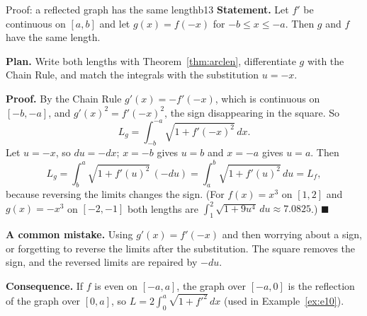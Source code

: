 \documentclass[11pt]{article}
\begin{document}
\begin{exmp}{Proof: a reflected graph has the same length}{b13}
\textbf{Statement.} Let $f'$ be continuous on $[a,b]$ and let $g(x)=f(-x)$ for $-b\le x\le-a$. Then $g$ and $f$ have the same length.

\textbf{Plan.} Write both lengths with Theorem~\ref{thm:arclen}, differentiate $g$ with the Chain Rule, and match the integrals with the substitution $u=-x$.

\textbf{Proof.} By the Chain Rule $g'(x)=-f'(-x)$, which is continuous on $[-b,-a]$, and $g'(x)^2=f'(-x)^2$, the sign disappearing in the square. So
\[
L_g=\int_{-b}^{-a}\sqrt{1+f'(-x)^2}\,dx .
\]
Let $u=-x$, so $du=-dx$; $x=-b$ gives $u=b$ and $x=-a$ gives $u=a$. Then
\[
L_g=\int_b^a\sqrt{1+f'(u)^2}\,(-du)=\int_a^b\sqrt{1+f'(u)^2}\,du=L_f ,
\]
because reversing the limits changes the sign. (For $f(x)=x^3$ on $[1,2]$ and $g(x)=-x^3$ on $[-2,-1]$ both lengths are $\int_1^2\sqrt{1+9u^4}\,du\approx7.0825$.) $\blacksquare$

\textbf{A common mistake.} Using $g'(x)=f'(-x)$ and then worrying about a sign, or forgetting to reverse the limits after the substitution. The square removes the sign, and the reversed limits are repaired by $-du$.

\textbf{Consequence.} If $f$ is even on $[-a,a]$, the graph over $[-a,0]$ is the reflection of the graph over $[0,a]$, so $L=2\int_0^a\sqrt{1+f'^2}\,dx$ (used in Example~\ref{ex:e10}).
\end{exmp}
\end{document}
